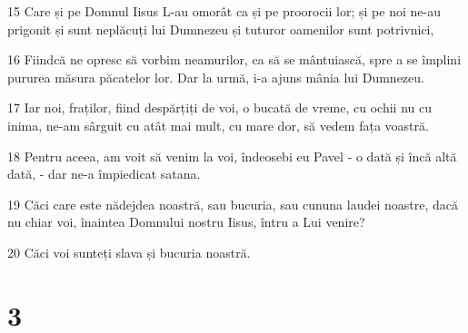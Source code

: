 \par 15 Care și pe Domnul Iisus L-au omorât ca și pe proorocii lor; și pe noi ne-au prigonit și sunt neplăcuți lui Dumnezeu și tuturor oamenilor sunt potrivnici,
\par 16 Fiindcă ne opresc să vorbim neamurilor, ca să se mântuiască, spre a se împlini pururea măsura păcatelor lor. Dar la urmă, i-a ajuns mânia lui Dumnezeu.
\par 17 Iar noi, fraților, fiind despărțiți de voi, o bucată de vreme, cu ochii nu cu inima, ne-am sârguit cu atât mai mult, cu mare dor, să vedem fața voastră.
\par 18 Pentru aceea, am voit să venim la voi, îndeosebi eu Pavel - o dată și încă altă dată, - dar ne-a împiedicat satana.
\par 19 Căci care este nădejdea noastră, sau bucuria, sau cununa laudei noastre, dacă nu chiar voi, înaintea Domnului nostru Iisus, întru a Lui venire?
\par 20 Căci voi sunteți slava și bucuria noastră.

\chapter{3}


